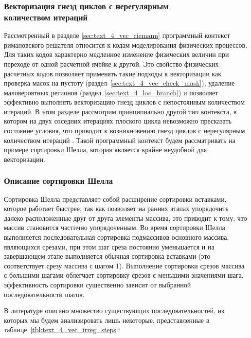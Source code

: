 \subsubsection{Векторизация гнезд циклов с нерегулярным \\ количеством итераций}\label{sec:text_4_vec_irreg}

Рассмотренный в разделе \ref{sec:text_4_vec_riemann} программный контекст римановского решателя\label{term:riemann_solver7} относится к кодам моделирования физических процессов.
Для таких кодов характерно медленное изменение физических величин при переходе от одной расчетной ячейке к другой.
Это свойство физических расчетных кодов позволяет применять такие подходы к векторизации как проверка масок на пустоту\label{term:meth_vec_check3} (раздел~\ref{sec:text_4_vec_check_mask}), удаление маловероятных регионов\label{term:meth_vec_del_low_prob_regions2} (раздел~\ref{sec:text_4_loc_branch}) и позволяет эффективно выполнять векторизацию гнезд циклов с непостоянным количеством итераций.
В этом разделе рассмотрим принципиально другой тип контекста, в котором на двух соседних итерациях плоского цикла невозможно пресказать состояние условия, что приводит к возникновению гнезд циклов с нерегулярным количеством итераций \cite{Rybakov2019VecIrr,Shabanov2019VecSci}.
Такой программный контекст будем рассматривать на примере сортировки Шелла, которая является крайне неудобной для векторизации.

\subsubsection{Описание сортировки Шелла}

\label{term:shell_sort}Сортировка Шелла \cite{Knut1994} представляет собой расширение сортировки вставками, которое работает быстрее, так как позволяет на ранних этапах упорядочить далеко расположенные друг от друга элементы массива, это приводит к тому, что массив становится частично упорядоченным.
Во время сортировки Шелла выполняется последовательная сортировка подмассивов основного массива, являющихся срезами, при этом шаг среза постоянно уменьшается и на завершающем этапе выполняется обычная сортировка вставками (это соответствует срезу массива с шагом 1).
Выполнение сортировки срезов массива с большими шагами облегчает сортировку срезов с меньшими значениями шага, эффективность сортировки существенно зависит от выбранной последовательности шагов.

В литературе описано множество существующих последовательностей, из которых мы будем анализировать лишь некоторые, представленные в таблице~\ref{tbl:text_4_vec_irreg_steps}:


